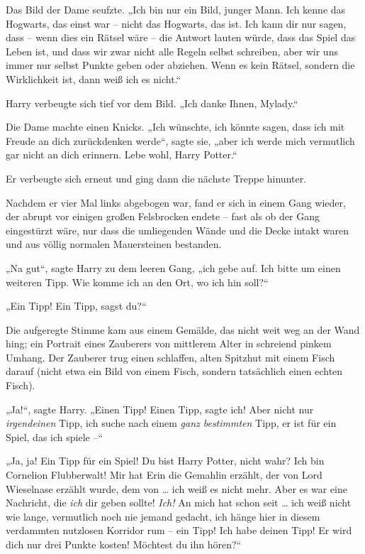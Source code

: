 Das Bild der Dame seufzte. „Ich bin nur ein Bild, junger Mann. Ich kenne das Hogwarts, das einst war – nicht das Hogwarts, das ist. Ich kann dir nur sagen, dass – wenn dies ein Rätsel wäre – die Antwort lauten würde, dass das Spiel das Leben ist, und dass wir zwar nicht alle Regeln selbst schreiben, aber wir uns immer nur selbst Punkte geben oder abziehen. Wenn es kein Rätsel, sondern die Wirklichkeit ist, dann weiß ich es nicht.“ 

Harry verbeugte sich tief vor dem Bild. „Ich danke Ihnen, Mylady.“ 

Die Dame machte einen Knicks. „Ich wünschte, ich könnte sagen, dass ich mit Freude an dich zurückdenken werde“, sagte sie, „aber ich werde mich vermutlich gar nicht an dich erinnern. Lebe wohl, Harry Potter.“ 

Er verbeugte sich erneut und ging dann die nächste Treppe hinunter. 

Nachdem er vier Mal links abgebogen war, fand er sich in einem Gang wieder, der abrupt vor einigen großen Felsbrocken endete – fast als ob der Gang eingestürzt wäre, nur dass die umliegenden Wände und die Decke intakt waren und aus völlig normalen Mauersteinen bestanden. 

„Na gut“, sagte Harry zu dem leeren Gang, „ich gebe auf. Ich bitte um einen weiteren Tipp. Wie komme ich an den Ort, wo ich hin soll?“ 

„Ein Tipp! Ein Tipp, sagst du?“ 

Die aufgeregte Stimme kam aus einem Gemälde, das nicht weit weg an der Wand hing; ein Portrait eines Zauberers von mittlerem Alter in schreiend pinkem Umhang. Der Zauberer trug einen schlaffen, alten Spitzhut mit einem Fisch darauf (nicht etwa ein Bild von einem Fisch, sondern tatsächlich einen echten Fisch). 

„Ja!“, sagte Harry. „Einen Tipp! Einen Tipp, sagte ich! Aber nicht nur \emph{irgendeinen} Tipp, ich suche nach einem \emph{ganz bestimmten} Tipp, er ist für ein Spiel, das ich spiele –“ 

„Ja, ja! Ein Tipp für ein Spiel! Du bist Harry Potter, nicht wahr? Ich bin Cornelion Flubberwalt! Mir hat Erin die Gemahlin erzählt, der von Lord Wieselnase erzählt wurde, dem von … ich weiß es nicht mehr. Aber es war eine Nachricht, die \emph{ich} dir geben sollte! \emph{Ich!} An mich hat schon seit … ich weiß nicht wie lange, vermutlich noch nie jemand gedacht, ich hänge hier in diesem verdammten nutzlosen Korridor rum – ein Tipp! Ich habe deinen Tipp! Er wird dich nur drei Punkte kosten! Möchtest du ihn hören?“ 

